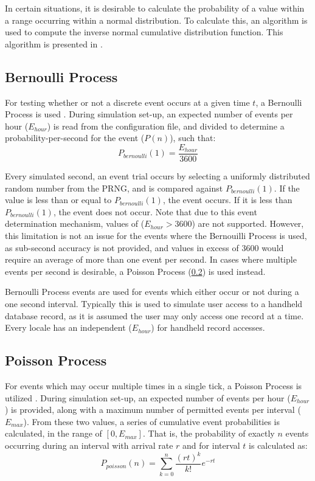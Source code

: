 In certain situations, it is desirable to calculate the probability of a value within a range occurring within a normal distribution.  To calculate this, an algorithm is used to compute the inverse normal cumulative distribution function.  This algorithm is presented in \cite{ltqnorm}.

\subsection{Bernoulli Process}\label{bernoulli}

For testing whether or not a discrete event occurs at a given time $t$, a Bernoulli Process is used \cite{RefWorks:40}.  During simulation set-up, an expected number of events per hour ($E_{hour}$) is read from the configuration file, and divided to determine a probability-per-second for the event ($P(n)$), such that:
\begin{equation}
P_{bernoulli}(1)=\frac{E_{hour}}{3600}\label{bernoulli_prob}
\end{equation}

Every simulated second, an event trial occurs by selecting a uniformly distributed random number from the PRNG, and is compared against $P_{bernoulli}(1)$.  If the value is less than or equal to $P_{bernoulli}(1)$, the event occurs.  If it is less than $P_{bernoulli}(1)$, the event does not occur.  Note that due to this event determination mechanism, values of ($E_{hour}>3600$) are not supported.  However, this limitation is not an issue for the events where the Bernouilli Process is used, as sub-second accuracy is not provided, and values in excess of $3600$ would require an average of more than one event per second.  In cases where multiple events per second is desirable, a Poisson Process (\ref{poisson}) is used instead.

Bernoulli Process events are used for events which either occur or not during a one second interval.  Typically this is used to simulate user access to a handheld database record, as it is assumed the user may only access one record at a time.  Every locale has an independent ($E_{hour}$) for handheld record accesses.

\subsection{Poisson Process}\label{poisson}

For events which may occur multiple times in a single tick, a Poisson Process is utilized \cite{RefWorks:38, RefWorks:40, 335391}.  During simulation set-up, an expected number of events per hour ($E_{hour}$) is provided, along with a maximum number of permitted events per interval ($E_{max}$).  From these two values, a series of cumulative event probabilities is calculated, in the range of $[0, E_{max}]$.  That is, the probability of exactly $n$ events occurring during an interval with arrival rate $r$ and for interval $t$ is calculated as:
\begin{equation}
P_{poisson}(n) = \sum_{k=0}^n \frac{(rt)^k}{k!}e^{-rt}\label{poisson1}
\end{equation}

